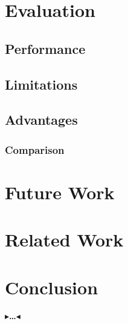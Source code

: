 \documentclass[twoside,11pt,openright]{report}
\newcommand{\todo}[1]{{\color[rgb]{.5,0,0}\textbf{$\blacktriangleright$#1$\blacktriangleleft$}}}
\begin{document}
\chapter{Evaluation}
\section{Performance}
\section{Limitations}
\section{Advantages}
\subsection{Comparison}


\chapter{Future Work}


\chapter{Related Work}


\chapter{Conclusion}
\label{ch:conclusion}

\todo{\dots}


\end{document}
